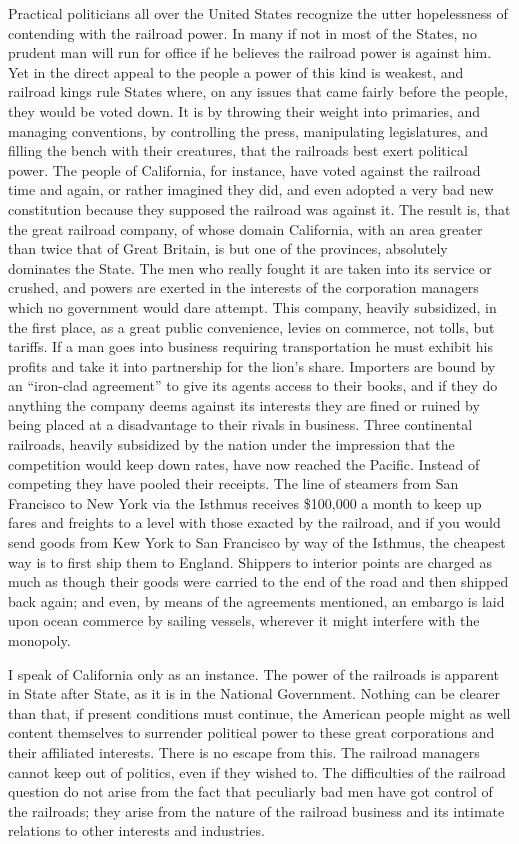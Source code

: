 \documentclass{book}
\begin{document}
Practical politicians all over the United States recognize the utter hopelessness of contending with the railroad power. In many if not in most of the States, no prudent man will run for office if he believes the railroad power is against him. Yet in the direct appeal to the people a power of this kind is weakest, and railroad kings rule States where, on any issues that came fairly before the people, they would be voted down. It is by throwing their weight into primaries, and managing conventions, by controlling the press, manipulating legislatures, and filling the bench with their creatures, that the railroads best exert political power. The people of California, for instance, have voted against the railroad time and again, or rather imagined they did, and even adopted a very bad new constitution because they supposed the railroad was against it. The result is, that the great railroad company, of whose domain California, with an area greater than twice that of Great Britain, is but one of the provinces, absolutely dominates the State. The men who really fought it are taken into its service or crushed, and powers are exerted in the interests of the corporation managers which no government would dare attempt. This company, heavily subsidized, in the first place, as a great public convenience, levies on commerce, not tolls, but tariffs. If a man goes into business requiring transportation he must exhibit his profits and take it into partnership for the lion’s share. Importers are bound by an “iron-clad agreement” to give its agents access to their books, and if they do anything the company deems against its interests they are fined or ruined by being placed at a disadvantage to their rivals in business. Three continental railroads, heavily subsidized by the nation under the impression that the competition would keep down rates, have now reached the Pacific. Instead of competing they have pooled their receipts. The line of steamers from San Francisco to New York via the Isthmus receives \$100,000 a month to keep up fares and freights to a level with those exacted by the railroad, and if you would send goods from Kew York to San Francisco by way of the Isthmus, the cheapest way is to first ship them to England. Shippers to interior points are charged as much as though their goods were carried to the end of the road and then shipped back again; and even, by means of the agreements mentioned, an embargo is laid upon ocean commerce by sailing vessels, wherever it might interfere with the monopoly.

I speak of California only as an instance. The power of the railroads is apparent in State after State, as it is in the National Government. Nothing can be clearer than that, if present conditions must continue, the American people might as well content themselves to surrender political power to these great corporations and their affiliated interests. There is no escape from this. The railroad managers cannot keep out of politics, even if they wished to. The difficulties of the railroad question do not arise from the fact that peculiarly bad men have got control of the railroads; they arise from the nature of the railroad business and its intimate relations to other interests and industries.
\end{document}
